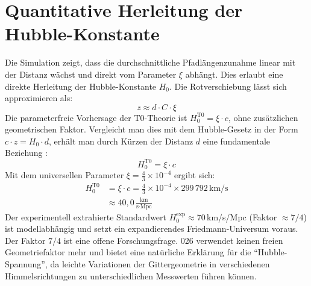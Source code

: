 	\section{Quantitative Herleitung der Hubble-Konstante}
	Die Simulation zeigt, dass die durchschnittliche Pfadlängenzunahme linear mit der Distanz wächst und direkt vom Parameter $\xi$ abhängt. Dies erlaubt eine direkte Herleitung der Hubble-Konstante $H_0$.
	Die Rotverschiebung lässt sich approximieren als:
	\begin{equation}
		z \approx d \cdot C \cdot \xi
	\end{equation}
	Die parameterfreie Vorhersage der T0-Theorie ist $H_0^{\text{T0}} = \xi \cdot c$, ohne zusätzlichen geometrischen Faktor.
	Vergleicht man dies mit dem Hubble-Gesetz in der Form $c \cdot z = H_0 \cdot d$, erhält man durch Kürzen der Distanz $d$ eine fundamentale Beziehung \cite{pascher:geometric_formalism}:
	\begin{equation}
		H_0^{\text{T0}} = \xi \cdot c
	\end{equation}
	Mit dem universellen Parameter $\xi = \frac{4}{3} \times 10^{-4}$ ergibt sich:
	\begin{align*}
		H_0^{\text{T0}} &= \xi \cdot c = \frac{4}{3} \times 10^{-4} \times 299\,792\,\text{km/s} \\
		&\approx 40{,}0 \, \frac{\text{km}}{\text{s} \cdot \text{Mpc}}
	\end{align*}
	Der experimentell extrahierte Standardwert $H_0^{\text{exp}} \approx 70\,$km/s/Mpc (Faktor $\approx 7/4$) ist modellabhängig und setzt ein expandierendes Friedmann-Universum voraus. Der Faktor $7/4$ ist eine offene Forschungsfrage. 026 verwendet keinen freien Geometriefaktor mehr \cite{riess2019} und bietet eine natürliche Erklärung für die ``Hubble-Spannung'', da leichte Variationen der Gittergeometrie in verschiedenen Himmelsrichtungen zu unterschiedlichen Messwerten führen können.
